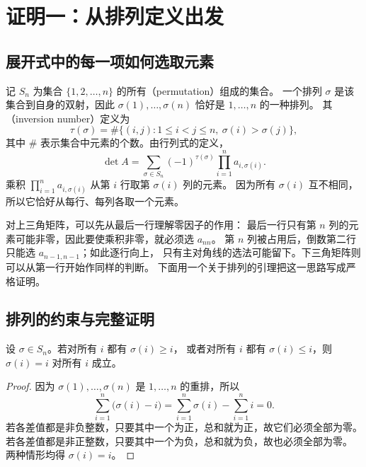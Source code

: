 \documentclass[UTF8,12pt,a4paper,fontset=fandol]{ctexart}
\begin{document}
\section{证明一：从排列定义出发}
\label{sec:permutation-proof}

\subsection{展开式中的每一项如何选取元素}

记 $S_n$ 为集合 $\{1,2,\ldots,n\}$ 的所有（permutation）组成的集合。
一个排列 $\sigma$ 是该集合到自身的双射，因此
$\sigma(1),\ldots,\sigma(n)$ 恰好是 $1,\ldots,n$ 的一种排列。
其（inversion number）定义为
\[
  \tau(\sigma)
  =\#\{(i,j):1\leq i<j\leq n,\ \sigma(i)>\sigma(j)\},
\]
其中 $\#$ 表示集合中元素的个数。由行列式的定义，
\begin{equation}
  \det A
  =\sum_{\sigma\in S_n}(-1)^{\tau(\sigma)}
    \prod_{i=1}^{n}a_{i,\sigma(i)}.
  \label{eq:leibniz-formula}
\end{equation}
乘积 $\prod_{i=1}^{n}a_{i,\sigma(i)}$ 从第 $i$ 行取第 $\sigma(i)$ 列的元素。
因为所有 $\sigma(i)$ 互不相同，所以它恰好从每行、每列各取一个元素。

对上三角矩阵，可以先从最后一行理解零因子的作用：
最后一行只有第 $n$ 列的元素可能非零，因此要使乘积非零，就必须选 $a_{nn}$。
第 $n$ 列被占用后，倒数第二行只能选 $a_{n-1,n-1}$；如此逐行向上，
只有主对角线的选法可能留下。下三角矩阵则可以从第一行开始作同样的判断。
下面用一个关于排列的引理把这一思路写成严格证明。

\subsection{排列的约束与完整证明}

\begin{lemma}
\label{lem:one-sided-permutation}
设 $\sigma\in S_n$。若对所有 $i$ 都有 $\sigma(i)\geq i$，
或者对所有 $i$ 都有 $\sigma(i)\leq i$，则 $\sigma(i)=i$ 对所有 $i$ 成立。
\end{lemma}

\begin{proof}
因为 $\sigma(1),\ldots,\sigma(n)$ 是 $1,\ldots,n$ 的重排，所以
\[
  \sum_{i=1}^{n}\bigl(\sigma(i)-i\bigr)
  =\sum_{i=1}^{n}\sigma(i)-\sum_{i=1}^{n}i=0.
\]
若各差值都是非负整数，只要其中一个为正，总和就为正，故它们必须全部为零。
若各差值都是非正整数，只要其中一个为负，总和就为负，故也必须全部为零。
两种情形均得 $\sigma(i)=i$。
\end{proof}
\end{document}
